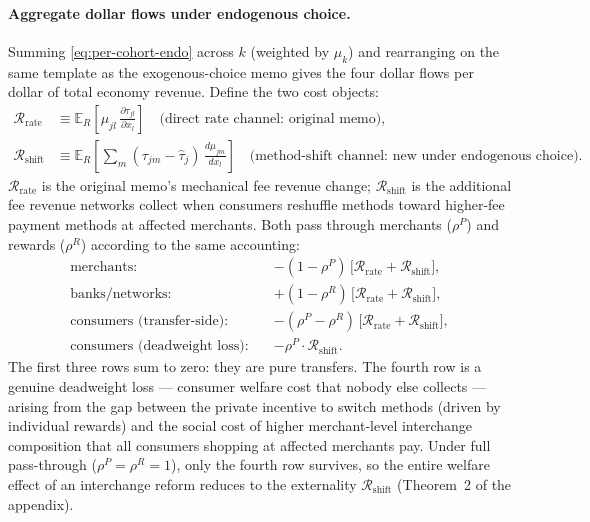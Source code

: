 \documentclass[11pt]{article}
\begin{document}
\paragraph{Aggregate dollar flows under endogenous choice.}
Summing \eqref{eq:per-cohort-endo} across $k$ (weighted by $\mu_k$) and rearranging on the same template as the exogenous-choice memo gives the four dollar flows per dollar of total economy revenue.
Define the two cost objects:
\begin{align*}
\mathcal{R}_{\text{rate}} &\equiv \mathbb{E}_R\!\left[\mu_{jl}\,\tfrac{\partial\tau_{jl}}{\partial x_l}\right]
\quad\text{(direct rate channel: original memo)},\\
\mathcal{R}_{\text{shift}} &\equiv \mathbb{E}_R\!\left[\sum_m(\tau_{jm}-\hat\tau_j)\,\tfrac{d\mu_{jm}}{dx_l}\right]
\quad\text{(method-shift channel: new under endogenous choice)}.
\end{align*}
$\mathcal{R}_{\text{rate}}$ is the original memo's mechanical fee revenue change; $\mathcal{R}_{\text{shift}}$ is the additional fee revenue networks collect when consumers reshuffle methods toward higher-fee payment methods at affected merchants.
Both pass through merchants ($\rho^P$) and rewards ($\rho^R$) according to the same accounting:
\[
\begin{aligned}
\text{merchants:} \quad & -(1-\rho^P)\,\bigl[\mathcal{R}_{\text{rate}} + \mathcal{R}_{\text{shift}}\bigr], \\
\text{banks/networks:} \quad & +(1-\rho^R)\,\bigl[\mathcal{R}_{\text{rate}} + \mathcal{R}_{\text{shift}}\bigr], \\
\text{consumers (transfer-side):} \quad & -(\rho^P-\rho^R)\,\bigl[\mathcal{R}_{\text{rate}} + \mathcal{R}_{\text{shift}}\bigr], \\
\text{consumers (deadweight loss):} \quad & -\rho^P \cdot \mathcal{R}_{\text{shift}}.
\end{aligned}
\]
The first three rows sum to zero: they are pure transfers.
The fourth row is a genuine deadweight loss --- consumer welfare cost that nobody else collects --- arising from the gap between the private incentive to switch methods (driven by individual rewards) and the social cost of higher merchant-level interchange composition that all consumers shopping at affected merchants pay.
Under full pass-through ($\rho^P=\rho^R=1$), only the fourth row survives, so the entire welfare effect of an interchange reform reduces to the externality $\mathcal{R}_{\text{shift}}$ (Theorem~2 of the appendix).
\end{document}
